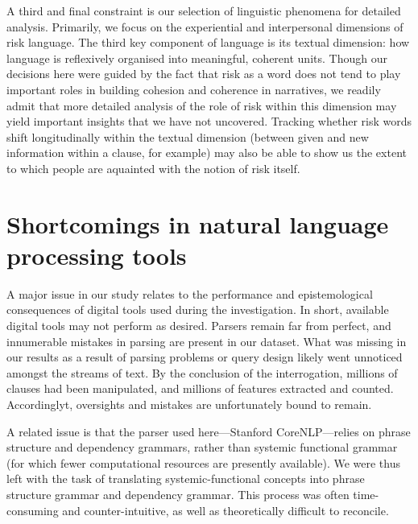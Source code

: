 A third and final constraint is our selection of linguistic phenomena for detailed analysis. Primarily, we focus on the experiential and interpersonal dimensions of risk language. The third key component of language is its textual dimension: how language is reflexively organised into meaningful, coherent units. Though our decisions here were guided by the fact that risk as a word does not tend to play important roles in building cohesion and coherence in narratives, we readily admit that more detailed analysis of the role of risk within this dimension may yield important insights that we have not uncovered. Tracking whether risk words shift longitudinally within the textual dimension (between given and new information within a clause, for example) may also be able to show us the extent to which people are aquainted with the notion of risk itself.


\section{Shortcomings in natural language processing tools}

	A major issue in our study relates to the performance and epistemological consequences of digital tools used during the investigation. In short, available digital tools may not perform as desired. Parsers remain far from perfect, and innumerable mistakes in parsing are present in our dataset. What was missing in our results as a result of parsing problems or query design likely went unnoticed amongst the streams of text. By the conclusion of the interrogation, millions of clauses had been manipulated, and millions of features extracted and counted. Accordinglyt, oversights and mistakes are unfortunately bound to remain.

    A related issue is that the parser used here---Stanford CoreNLP---relies on phrase structure and dependency grammars, rather than systemic functional grammar (for which fewer computational resources are presently available). We were thus left with the task of translating systemic-functional concepts into phrase structure grammar and dependency grammar. This process was often time-consuming and counter-intuitive, as well as theoretically difficult to reconcile.


